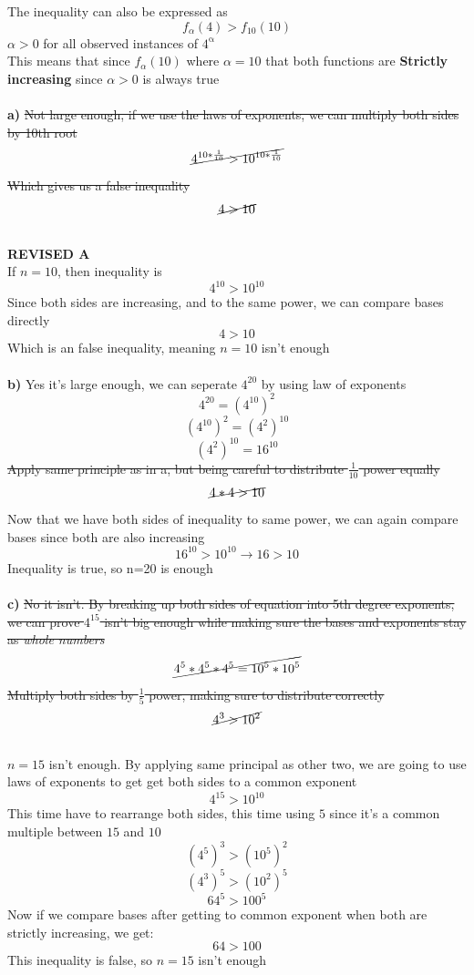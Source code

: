 \documentclass{article}
\begin{document}
The inequality can also be expressed as
$$ f_{\alpha}(4)>f_{10}(10)$$
$\alpha>0$ for all observed instances of $\mathrm{4^\alpha}$ 
\\
This means that since $f_{\alpha}(10)$ where $\alpha=10$ that both functions are \textbf{Strictly increasing} since $\alpha > 0$ is always true
\\
\\
\textbf{a)}
\sout{Not large enough, if we use the laws of exponents, we can multiply both sides by 10th root}
$$ \cancel{\displaystyle4^{10*\frac{1}{10}}>10^{10*\frac{1}{10}}} $$
\sout{Which gives us a false inequality}
$$ \cancel{ 4>10} $$
\\
\textbf{REVISED A}
\\
If $n=10$, then inequality is 
$$4^{10}>10^{10}$$
Since both sides are increasing, and to the same power, we can compare bases directly
$$4>10$$
Which is an false inequality, meaning $n=10$ isn't enough
\\
\\
\textbf{b)}
Yes it's large enough, we can seperate $4^{20}$ by using law of exponents
$$ 4^{20}=(4^{10})^2$$
$$ (4^{10})^2=(4^2)^{10} $$
$$(4^2)^{10}=16^{10}$$
\sout{Apply same principle as in a, but being careful to distribute $\frac{1}{10}$ power equally}
$$ \cancel{4*4>10} $$
Now that we have both sides of inequality to same power, we can again compare bases since both are also increasing
$$ 16^{10}>10^{10} \rightarrow 16>10 $$
Inequality is true, so n=20 is enough
\\
\\
\textbf{c)}
\sout{No it isn't. By breaking up both sides of equation into 5th degree exponents, we can prove $4^{15}$ isn't big enough while making sure the bases and exponents stay as \textit{whole numbers}}
$$ \cancel{ 4^5*4^5*4^5=10^5*10^5} $$
\sout{Multiply both sides by $\frac{1}{5}$ power, making sure to distribute correctly}
$$ \cancel{4^3>10^2} $$
\\
$n=15$ isn't enough. By applying same principal as other two, we are going to use laws of exponents to get get both sides to a common exponent
$$4^{15}>10^{10}$$
This time have to rearrange both sides, this time using $5$ since it's a common multiple between $15$ and $10$
$$(4^5)^3>(10^5)^2$$
$$(4^3)^5>(10^2)^5$$
$$64^5>100^5$$
Now if we compare bases after getting to common exponent when both are strictly increasing, we get:
$$ 64>100 $$
This inequality is false, so $n=15$ isn't enough
\end{document}
